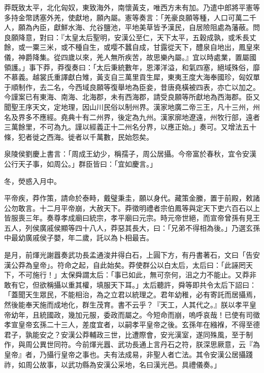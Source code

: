 \begin{pinyinscope}
莽既致太平，北化匈奴，東致海外，南懷黃支，唯西方未有加。乃遣中郎將平憲等多持金幣誘塞外羌，使獻地，願內屬。憲等奏言：「羌豪良願等種，人口可萬二千人，願為內臣，獻鮮水海、允谷鹽池，平地美草皆予漢民，自居險阻處為藩蔽。問良願降意，對曰：『太皇太后聖明，安漢公至仁，天下太平，五穀成孰，或禾長丈餘，或一粟三米，或不種自生，或嘤不蠶自成，甘露從天下，醴泉自地出，鳳皇來儀，神爵降集。從四歲以來，羌人無所疾苦，故思樂內屬。』宜以時處業，置屬國領護。」事下莽，莽復奏曰：「太后秉統數年，恩澤洋溢，和氣四塞，絕域殊俗，靡不慕義。越裳氏重譯獻白雉，黃支自三萬里貢生犀，東夷王度大海奉國珍，匈奴單于順制作，去二名，今西域良願等復舉地為臣妾，昔唐堯橫被四表，亦亡以加之。今謹案已有東海、南海、北海郡，未有西海郡，請受良願等所獻地為西海郡。臣又聞聖王序天文，定地理，因山川民俗以制州界。漢家地廣二帝三王，凡十三州，州名及界多不應經。堯典十有二州界，後定為九州。漢家廓地遼遠，州牧行部，遠者三萬餘里，不可為九。謹以經義正十二州名分界，以應正始。」奏可。又增法五十條，犯者徙之西海。徙者以千萬數，民始怨矣。

泉陵侯劉慶上書言：「周成王幼少，稱孺子，周公居攝。今帝富於春秋，宜令安漢公行天子事，如周公。」群臣皆曰：「宜如慶言。」

冬，熒惑入月中。

平帝疾，莽作策，請命於泰畤，戴璧秉圭，願以身代。藏策金縢，置于前殿，敕諸公勿敢言。十二月平帝崩，大赦天下。莽徵明禮者宗伯鳳等與定天下吏六百石以上皆服喪三年。奏尊孝成廟曰統宗，孝平廟曰元宗。時元帝世絕，而宣帝曾孫有見王五人，列侯廣戚侯顯等四十八人，莽惡其長大，曰：「兄弟不得相為後。」乃選玄孫中最幼廣戚侯子嬰，年二歲，託以為卜相最吉。

是月，前煇光謝囂奏武功長孟通浚井得白石，上圓下方，有丹書著石，文曰「告安漢公莽為皇帝」。符命之起，自此始矣。莽使群公以白太后，太后曰：「此誣罔天下，不可施行！」太保舜謂太后：「事已如此，無可奈何，沮之力不能止。又莽非敢有它，但欲稱攝以重其權，填服天下耳。」太后聽許，舜等即共令太后下詔曰：「蓋聞天生眾民，不能相治，為之立君以統理之。君年幼稚，必有寄託而居攝焉，然後能奉天施而成地化，群生茂育。書不云乎？『天工，人其代之。』朕以孝平皇帝幼年，且統國政，幾加元服，委政而屬之。今短命而崩，嗚呼哀哉！已使有司徵孝宣皇帝玄孫二十三人，差度宜者，以嗣孝平皇帝之後。玄孫年在繈褓，不得至德君子，孰能安之？安漢公莽輔政三世，比遭際會，安光漢室，遂同殊風，至于制作，與周公異世同符。今前煇光囂、武功長通上言丹石之符，朕深思厥意，云『為皇帝』者，乃攝行皇帝之事也。夫有法成易，非聖人者亡法。其令安漢公居攝踐祚，如周公故事，以武功縣為安漢公采地，名曰漢光邑。具禮儀奏。」


\end{pinyinscope}
